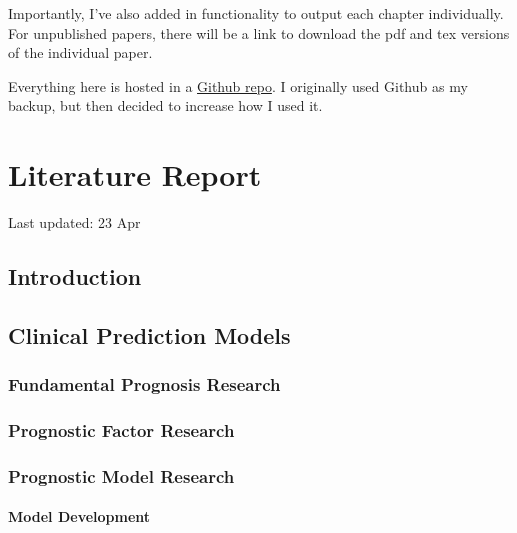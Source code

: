 \documentclass[12pt,PhD,twoside,openright]{muthesis}
\begin{document}
Importantly, I've also added in functionality to output each chapter individually. For unpublished papers, there will be a link to download the pdf and tex versions of the individual paper.

Everything here is hosted in a \href{https://https://github.com/MyKo101/Thesis}{Github repo}. I originally used Github as my backup, but then decided to increase how I used it.

\hypertarget{chap-lit-report}{%
\chapter{Literature Report}\label{chap-lit-report}}


Last updated: 23 Apr

\hypertarget{introduction-1}{%
\section{Introduction}\label{introduction-1}}

\hypertarget{clinical-prediction-models}{%
\section{Clinical Prediction Models}\label{clinical-prediction-models}}

\hypertarget{fundamental-prognosis-research}{%
\subsection{Fundamental Prognosis Research}\label{fundamental-prognosis-research}}

\hypertarget{prognostic-factor-research}{%
\subsection{Prognostic Factor Research}\label{prognostic-factor-research}}

\hypertarget{prognostic-model-research}{%
\subsection{Prognostic Model Research}\label{prognostic-model-research}}

\hypertarget{model-development}{%
\subsubsection{Model Development}\label{model-development}}
\end{document}
